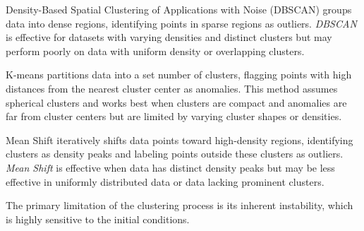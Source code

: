 Density-Based Spatial Clustering of Applications with Noise (DBSCAN) \cite{schubert2017dbscan} groups data into dense regions, identifying points in sparse regions as outliers. \textit{DBSCAN} is effective for datasets with varying densities and distinct clusters but may perform poorly on data with uniform density or overlapping clusters.

K-means \cite{munz2007traffic} partitions data into a set number of clusters, flagging points with high distances from the nearest cluster center as anomalies. This method assumes spherical clusters and works best when clusters are compact and anomalies are far from cluster centers but are limited by varying cluster shapes or densities.

Mean Shift \cite{yang2021mean} iteratively shifts data points toward high-density regions, identifying clusters as density peaks and labeling points outside these clusters as outliers. \textit{Mean Shift} is effective when data has distinct density peaks but may be less effective in uniformly distributed data or data lacking prominent clusters.

The primary limitation of the clustering process is its inherent instability, which is highly sensitive to the initial conditions.